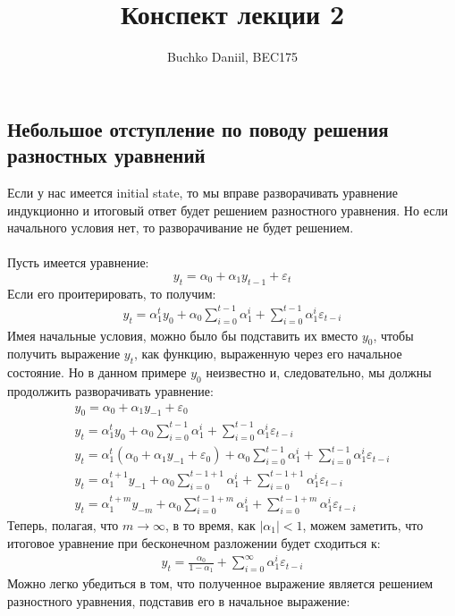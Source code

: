 \documentclass[]{article}
\title{Конспект лекции 2}
\author{Buchko Daniil, BEC175}
\begin{document}
	\maketitle
	
\subsection*{Небольшое отступление по поводу решения разностных уравнений}	
Если у нас имеется initial state, то мы вправе разворачивать уравнение индукционно и итоговый ответ будет решением разностного уравнения. Но если начального условия нет, то разворачивание не будет решением.\\\\
Пусть имеется уравнение:
\[
	y_t = \alpha_0 + \alpha_1y_{t-1} + \varepsilon_{t}
\]
Если его проитерировать, то получим:
\begin{gather*}
\boxed{	y_t = \alpha_1^ty_0 + \alpha_0\sum_{i=0}^{t-1}\alpha_1^i + \sum_{i=0}^{t-1}\alpha_1^{i}\varepsilon_{t-i}}
\end{gather*}
Имея начальные условия, можно было бы подставить их вместо $ y_0 $, чтобы получить выражение $ y_t $, как функцию, выраженную через его начальное состояние. Но в данном примере $ y_0 $ неизвестно и, следовательно, мы должны продолжить разворачивать уравнение:
\begin{gather*}
 y_0 = \alpha_0 + \alpha_1 y_{-1}+\varepsilon_{0} \\
 y_t = \alpha_1^ty_0 + \alpha_0\sum_{i=0}^{t-1}\alpha_1^i + \sum_{i=0}^{t-1}\alpha_1^{i}\varepsilon_{t-i} \\
 y_t = \alpha_1^t\left( \alpha_0 + \alpha_1 y_{-1}+\varepsilon_{0}\right) + \alpha_0\sum_{i=0}^{t-1}\alpha_1^i + \sum_{i=0}^{t-1}\alpha_1^{i}\varepsilon_{t-i}  \\
 y_t = \alpha_1^{t+1}y_{-1} + \alpha_0\sum_{i=0}^{t-1+1}\alpha_1^i + \sum_{i=0}^{t-1+1}\alpha_1^{i}\varepsilon_{t-i} \\
 y_t = \alpha_1^{t+m}y_{-m} + \alpha_0\sum_{i=0}^{t-1+m}\alpha_1^i + \sum_{i=0}^{t-1+m}\alpha_1^{i}\varepsilon_{t-i}
\end{gather*}
Теперь, полагая, что $ m\to\infty $, в то время, как $ |\alpha_1| < 1 $, можем заметить, что итоговое уравнение при бесконечном разложении будет сходиться к:
\begin{gather*}
	\boxed{
		y_t = \frac{\alpha_0}{1 - \alpha_1} + \sum_{i=0}^{\infty}\alpha_1^i\varepsilon_{t-i}
	}
\end{gather*}
Можно легко убедиться в том, что полученное выражение является решением разностного уравнения, подставив его в начальное выражение:
\end{document}
